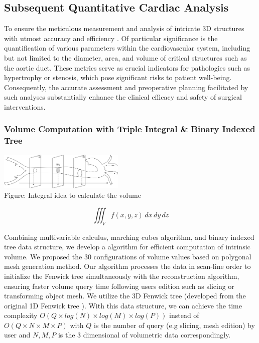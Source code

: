 \documentclass{article}
\begin{document}
\begin{multicols}{2}
\subsection{Subsequent Quantitative Cardiac Analysis}

To ensure the meticulous measurement and analysis of intricate 3D structures with utmost accuracy and efficiency \cite{intrinsic}. Of particular significance is the quantification of various parameters within the cardiovascular system, including but not limited to the diameter, area, and volume of critical structures such as the aortic duct. These metrics serve as crucial indicators for pathologies such as hypertrophy or stenosis, which pose significant risks to patient well-being. Consequently, the accurate assessment and preoperative planning facilitated by such analyses substantially enhance the clinical efficacy and safety of surgical interventions. 

\subsubsection{Volume Computation with Triple Integral \& Binary Indexed Tree}

\includegraphics[width=0.45\textwidth]{figures/Integral Surface Function.png} \\
Figure: Integral idea to calculate the volume

$$
\iiint_V f(x, y, z) \, dx \, dy \, dz
$$

Combining multivariable calculus, marching cubes algorithm, and binary indexed tree data structure, we develop a algorithm for efficient computation of intrinsic volume. We proposed the 30 configurations of volume values based on polygonal mesh generation method. Our algorithm processes the data in scan-line order to initialize the Fenwick tree simultaneously with the reconstruction algorithm, ensuring faster volume query time following users edition such as slicing or transforming object mesh. We utilize the 3D Fenwick tree (developed from the original 1D Fenwick tree \cite{fenwick}). With this data structure, we can achieve the time complexity $O(Q \times log(N) \times log(M) \times log(P))$ instead of $O (Q \times N \times M \times P)$ with $Q$ is the number of query (e.g slicing, mesh edition) by user and $N,M,P$ is the 3 dimensional of volumetric data correspondingly.


\end{multicols}
\end{document}
